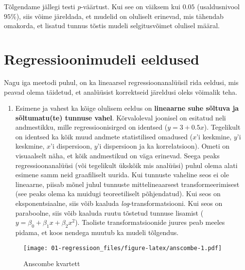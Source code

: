 \documentclass[
]{book}
\providecommand{\tightlist}{%
  \setlength{\itemsep}{0pt}\setlength{\parskip}{0pt}}
\begin{document}
Tõlgendame jällegi testi \emph{p}-väärtust. Kui see on väiksem kui \(0.05\) (usaldusnivool \(95\%\)), siis võime järeldada, et mudelid on oluliselt erinevad, mis tähendab omakorda, et lisatud tunnus tõstis mudeli selgitusvõimet olulisel määral.

\hypertarget{regressioonimudeli-eeldused}{%
\section{Regressioonimudeli eeldused}\label{regressioonimudeli-eeldused}}

Nagu iga meetodi puhul, on ka lineaarsel regressioonanalüüsil rida eeldusi, mis peavad olema täidetud, et analüüsist korrektseid järeldusi oleks võimalik teha.

\begin{enumerate}
\def\labelenumi{\arabic{enumi}.}
\tightlist
\item
  Esimene ja vahest ka kõige olulisem eeldus on \textbf{lineaarne suhe sõltuva ja sõltumatu(te) tunnuse vahel}. Kõrvaloleval joonisel on esitatud neli andmestikku, mille regressioonisirged on identsed (\(y=3+0.5x\)). Tegelikult on identsed ka kõik muud andmete statistilised omadused (\(x\)'i keskmine, \(y\)'i keskmine, \(x\)'i dispersioon, \(y\)'i dispersioon ja ka korrelatsioon). Ometi on visuaalselt näha, et kõik andmestikud on väga erinevad. Seega peaks regressioonanalüüsi (või tegelikult ükskõik mis analüüsi) puhul olema alati esimene samm neid graafiliselt uurida. Kui tunnuste vaheline seos ei ole lineaarne, piisab mõnel juhul tunnuste mittelineaarsest transformeerimisest (see peaks olema ka muidugi teoreetiliselt põhjendatud). Kui seos on eksponentsiaalne, siis võib kaaluda \emph{log}-transformatsiooni. Kui seos on paraboolne, siis võib kaaluda ruutu tõstetud tunnuse lisamist (\(y = \beta_0+\beta_1x+\beta_2x^2\)). Taoliste transformatsioonide juures peab meeles pidama, et koos nendega muutub ka mudeli tõlgendus.
\end{enumerate}

\begin{figure}
\centering
\texttt{[image: 01-regressioon\_files/figure-latex/anscombe-1.pdf]}
\caption{\label{fig:anscombe}Anscombe kvartett}
\end{figure}
\end{document}

